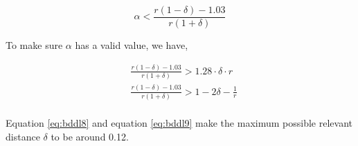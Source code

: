 \begin{equation}
\label{eq:bddl7}
    \alpha < \frac{r(1 - \delta) - 1.03}{r(1 + \delta)}
\end{equation}

To make sure $\alpha$ has a valid value, we have,

\begin{align}
& \frac{r(1 - \delta) - 1.03}{r(1 + \delta)} > 1.28 \cdot \delta \cdot r \label{eq:bddl8} \\
& \frac{r(1 - \delta) - 1.03}{r(1 + \delta)} > 1 - 2\delta - \frac{1}{r}  \label{eq:bddl9} \\
\end{align}

Equation \ref{eq:bddl8} and equation \ref{eq:bddl9} make the maximum possible relevant distance $\delta$ to be around 0.12.